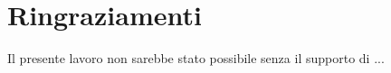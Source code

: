 \chapter{Ringraziamenti}
\label{cha:ringraziamenti}

Il presente lavoro non sarebbe stato possibile senza il supporto di ... 

